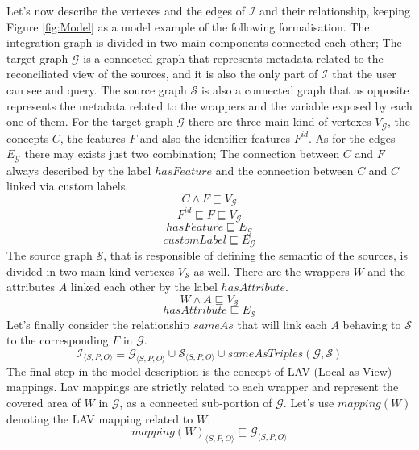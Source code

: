 \documentclass[12pt,a4paper]{report}
\newcommand\targetGraph{\mathcal{G}}
\newcommand\sourceGraph{\mathcal{S}}
\newcommand\integrationGraph{\mathcal{I}}
\newcommand\targetGraphVertex{V_{\targetGraph}}
\newcommand\targetGraphEdge{E_{\targetGraph}}
\newcommand\sourceGraphVertex{V_{\sourceGraph}}
\newcommand\sourceGraphEdge{E_{\sourceGraph}}
\newcommand\subject{S}
\newcommand\predicate{P}
\newcommand\object{O}
\newcommand\concept{C}
\newcommand\feature{F}
\newcommand\idFeature{\feature^{id}}
\newcommand\wrapper{W}
\newcommand\attribute{A}
\newcommand\hasFeature{hasFeature}
\newcommand\hasAttribute{hasAttribute}
\newcommand\sameAs{sameAs}
\newcommand\triple[1]{#1_{\set{\subject,\predicate,\object}}}
\newcommand\mapping{mapping}
\newcommand\set[1]{\langle #1 \rangle}
\begin{document}
Let's now describe the vertexes and the edges of $\integrationGraph$ and their relationship, keeping Figure \ref{fig:Model} as a model example of the following formalisation.
%
The integration graph is divided in two main components connected each other;
%
The target graph $\targetGraph$ is a connected graph that represents metadata related to the reconciliated view of the sources, and it is also the only part of $\integrationGraph$ that the user can see and query.
%
The source graph $\sourceGraph$ is also a connected graph that as opposite represents the metadata related to the wrappers and the variable exposed by each one of them.
%
For the target graph $\targetGraph$ there are three main kind of vertexes $\targetGraphVertex$, the concepts $\concept$, the features $\feature$ and also the identifier features $\idFeature$.
%
As for the edges $\targetGraphEdge$ there may exists just two combination;
%
The connection between $\concept$ and $\feature$ always described by the label $\hasFeature$ and the connection between $\concept$ and $\concept$ linked via custom labels.
%
\begin{equation}
    \concept \land \feature \sqsubseteq \targetGraphVertex
\end{equation}
%
\begin{equation}
    \idFeature \sqsubseteq \feature \sqsubseteq \targetGraphVertex
\end{equation}
%
\begin{equation}
    \hasFeature \sqsubseteq \targetGraphEdge
\end{equation}
%
\begin{equation}
    customLabel \sqsubseteq \targetGraphEdge
\end{equation}
%
The source graph $\sourceGraph$, that is responsible of defining the semantic of the sources, is divided in two main kind vertexes $\sourceGraphVertex$ as well.
%
There are the wrappers $\wrapper$ and the attributes $\attribute$ linked each other by the label $\hasAttribute$.
%
\begin{equation}
    \wrapper \land \attribute \sqsubseteq \sourceGraphVertex
\end{equation}
%
\begin{equation}
    \hasAttribute \sqsubseteq \sourceGraphEdge
\end{equation}
%
Let's finally consider the relationship $\sameAs$ that will link each $\attribute$ behaving to $\sourceGraph$ to the corresponding $\feature$ in $\targetGraph$.
%
\begin{equation}
    \triple{\integrationGraph} \equiv \triple{\targetGraph} \cup \triple{\sourceGraph} \cup sameAsTriples(\targetGraph, \sourceGraph)
\end{equation}
%
The final step in the model description is the concept of LAV (Local as View) mappings.
%
Lav mappings are strictly related to each wrapper and represent the covered area of $\wrapper$ in $\targetGraph$, as a connected sub-portion of $\targetGraph$.
%
Let's use $\mapping(\wrapper)$ denoting the LAV mapping related to $\wrapper$. 
%
\begin{equation}
    \triple{\mapping(\wrapper)} \sqsubseteq \triple{\targetGraph}
\end{equation}
\end{document}
